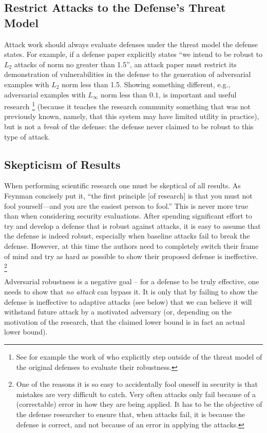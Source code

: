 \documentclass{article} %
\begin{document}
\subsection{Restrict Attacks to the Defense's Threat Model}
Attack work should always evaluate defenses under the
threat model the defense states.
%
For example, if a defense paper explicitly states
``we intend to be robust to $L_2$ attacks of norm no greater than
1.5'', an attack paper must restrict its demonstration of vulnerabilities
in the defense to the generation of adversarial
examples with $L_2$ norm less than 1.5. Showing something different,
e.g., adversarial examples with $L_\infty$ norm less than $0.1$,
is important and useful research%
\footnote{See for example the work of \cite{sharma2017breaking,song2018generative}
  who explicitly step outside of the threat model of the original defenses
  to evaluate their robustness.} (because it teaches the research community
something that was not previously known, namely, that this system may have
limited utility in practice), but is not a
\emph{break} of the defense: the defense never claimed to be robust to
this type of attack.


\subsection{Skepticism of Results}
When performing scientific research one must be skeptical of
all results.
%
As Feynman concisely put it, ``the first principle [of research] is that you
must not fool yourself---and you are the easiest person to fool.''
%
This is never more true than when considering security evaluations.
%
After spending significant effort to try and develop a defense
that is robust against attacks, it is easy to assume that the
defense is indeed robust, especially when baseline attacks
fail to break the defense.
%
However, at this time the authors need to completely switch
their frame of mind and try as hard as possible to show their
proposed defense is ineffective.%
\footnote{One of the reasons it is so easy to accidentally fool oneself in security
  is that mistakes are very difficult to catch. Very often attacks only fail
  because of a (correctable) error in how they are being applied. It has to be the
  objective of the defense researcher to ensure that, when attacks fail, it is
  because the defense is correct, and not because of an error in applying
  the attacks.}

Adversarial robustness is a negative goal -- for a
defense to be truly effective, one needs to show that \emph{no attack} can bypass it.
%
It is only that by failing to show the defense is ineffective to
adaptive attacks (see below) that we can
believe it will withstand future attack by a motivated adversary (or,
depending on the motivation of the research, that the claimed lower bound is
in fact an actual lower bound).
\end{document}

